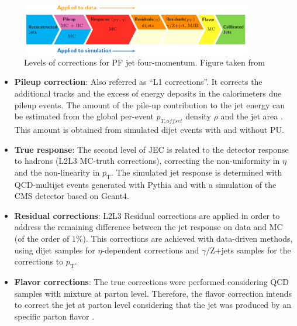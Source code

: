 \begin{figure}[ht]%
  \begin{center}
    \includegraphics[width=0.9\textwidth]{figuras/Chapter3/JEC_levels.png}
    \caption{Levels of corrections for PF jet four-momentum. Figure taken from \cite{JESandJER}}
    \label{fig:JEC_levels}
  \end{center}
\end{figure}
\begin{itemize}
 \item \textbf{Pileup correction}: Also referred as ``L1 corrections''. It corrects the additional tracks and the excess of energy deposits
in the calorimeters due pileup events. The amount of the pile-up contribution
to the jet energy can be estimated from the global per-event $p_{T,offset}$ density 
$\rho$ and the jet area \cite{JECpileup}. This amount is obtained from 
simulated dijet events with and without PU.
 \item \textbf{True response}: The second level of JEC is related to the detector response to hadrons (L2L3 MC-truth corrections), correcting
the non-uniformity in $\eta$ and the non-linearity in $p_{\textrm{T}}$. The simulated jet response is determined
with QCD-multijet events generated with Pythia and with a simulation of the CMS detector based
on Geant4.
 \item \textbf{Residual corrections}: L2L3 Residual corrections are applied in order to address the remaining difference
between the jet response on data and MC (of the order of $1 \%$). This corrections are achieved with data-driven methods, using
dijet samples for $\eta$-dependent corrections and $\gamma /$Z+jets samples for the corrections to $p_{\textrm{T}}$. 
 \item \textbf{Flavor corrections}: The true corrections were performed considering QCD samples with mixture at parton level. 
 Therefore, the flavor correction intends to correct the jet at parton level considering that the jet was produced 
 by an specific parton flavor \cite{CMS-PAS-JME-07-002}. 

\end{itemize}



